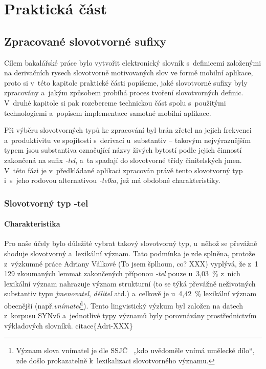 \part{Praktická část}

\hypertarget{zpracovanuxe9-slovotvornuxe9-sufixy}{%
\chapter{Zpracované slovotvorné
sufixy}\label{zpracovanuxe9-slovotvornuxe9-sufixy}}

Cílem bakalářské práce bylo vytvořit elektronický slovník s~definicemi
založenými na derivačních rysech slovotvorně motivovaných slov ve formě
mobilní aplikace, proto si v~této kapitole praktické části popíšeme,
jaké slovotvorné sufixy byly zpracovány a~jakým způsobem probíhá proces
tvoření slovotvorných definic. V~druhé kapitole si pak rozebereme
technickou část spolu s~použitými technologiemi a~popisem implementace
samotné mobilní aplikace.

Při výběru slovotvorných typů ke zpracování byl brán zřetel na jejich
frekvenci a~produktivitu ve spojitosti s~derivací u~substantiv --
takovým nejvýraznějším typem jsou substantiva označující názvy živých
bytostí podle jejich činností zakončená na sufix \emph{-tel}, a~ta
spadají do slovotvorné třídy činitelských jmen.
\parencite[17]{dokulil67} V~této fázi je v~předkládané aplikaci
zpracován právě tento slovotvorný typ i~s~jeho rodovou alternativou
\emph{-telka}, jež má obdobné charakteristiky.

\hypertarget{slovotvornuxfd-typ--tel}{%
\section{Slovotvorný typ -tel}\label{slovotvornuxfd-typ--tel}}

\hypertarget{charakteristika}{%
\subsection{Charakteristika}\label{charakteristika}}

Pro naše účely bylo důležité vybrat takový slovotvorný typ, u~něhož se
převážně shoduje slovotvorný a~lexikální význam. Tato podmínka je zde
splněna, protože z~výzkumné práce Adriany Válkové (To jsem šplhoun, co?
XXX) vyplývá, že z~1 129 zkoumaných lemmat zakončených příponou
\emph{-tel} pouze u~3,03~\% z~nich lexikální význam nahrazuje význam
strukturní (to se týká převážně neživotných substantiv typu
\emph{jmenovatel}, \emph{dělitel} atd.) a~celkově je u~4,42~\% lexikální
význam obecnější
(např.\emph{vnímatel}\footnote{Význam slova vnímatel je dle SSJČ~\parencite{ssjc} „kdo uvědoměle vnímá umělecké dílo“, zde došlo prokazatelně k~lexikalizaci slovotvorného významu.}).
Tento lingvistický výzkum byl založen na datech z~korpusu SYNv6
a~jednotlivé typy významů byly porovnávány prostřednictvím výkladových
slovníků. citace\{Adri-XXX\}

